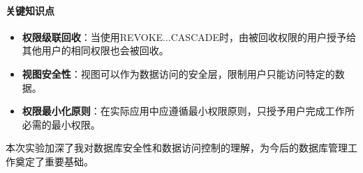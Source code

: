 \documentclass[a4paper]{article}
\begin{document}
\paragraph{关键知识点}
\begin{itemize}
    \item \textbf{权限级联回收}：当使用REVOKE...CASCADE时，由被回收权限的用户授予给其他用户的相同权限也会被回收。
    \item \textbf{视图安全性}：视图可以作为数据访问的安全层，限制用户只能访问特定的数据。
    \item \textbf{权限最小化原则}：在实际应用中应遵循最小权限原则，只授予用户完成工作所必需的最小权限。
\end{itemize}

本次实验加深了我对数据库安全性和数据访问控制的理解，为今后的数据库管理工作奠定了重要基础。
\end{document}
